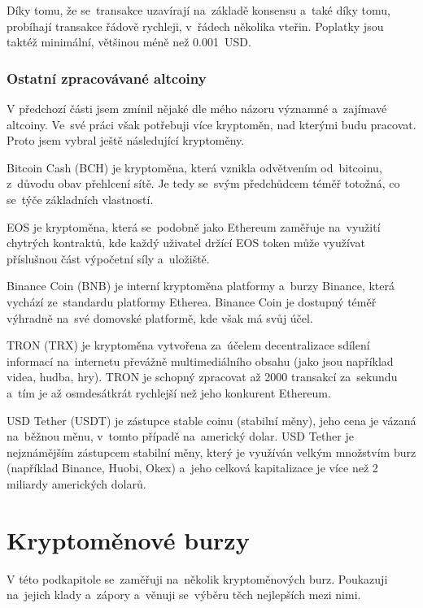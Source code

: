 \documentclass[thesis=B,czech]{FITthesis}[2019/03/21]
\begin{document}
Díky tomu, že se~transakce uzavírají na~základě konsensu a~také díky tomu, probíhají transakce řádově rychleji, v~řádech několika vteřin. Poplatky jsou taktéž minimální, většinou méně než 0.001~USD. \cite{bitinfocharts} \cite{coincodex_ripple}

\subsubsection{Ostatní zpracovávané altcoiny}
V předchozí části jsem zmínil nějaké dle mého názoru významné a~zajímavé altcoiny. Ve~své práci však potřebuji více kryptoměn, nad kterými budu pracovat. Proto jsem vybral ještě následující kryptoměny.

Bitcoin Cash (BCH) je kryptoměna, která vznikla odvětvením od~bitcoinu, z~důvodu obav přehlcení sítě. Je tedy se~svým předchůdcem téměř totožná, co se~týče základních vlastností. \cite{kurzy_bch}

EOS je kryptoměna, která se~podobně jako Ethereum zaměřuje na~využití chytrých kontraktů, kde každý uživatel držící EOS token může využívat \linebreak příslušnou část výpočetní síly a~uložiště. \cite{finex_eos}

Binance Coin (BNB) je interní kryptoměna platformy a~burzy Binance, která vychází ze~standardu platformy Etherea. Binance Coin je dostupný téměř výhradně na~své domovské platformě, kde však má svůj účel. \cite{martin_sistek_bnb}

TRON (TRX) je kryptoměna vytvořena za~účelem decentralizace sdílení informací na~internetu převážně multimediálního obsahu (jako jsou například videa, hudba, hry). TRON je schopný zpracovat až 2000 transakcí za~sekundu a~tím je až osmdesátkrát rychlejší než jeho konkurent Ethereum. \cite{finex_trx}

USD Tether (USDT) je zástupce stable coinu (stabilní měny), jeho cena je vázaná na~běžnou měnu, v~tomto případě na~americký dolar. USD Tether je nejznámějším zástupcem stabilní měny, který je využíván velkým množstvím burz (například Binance, Huobi, Okex) a~jeho celková kapitalizace je více než 2 miliardy amerických dolarů. \cite{mlady_investor_stable_coin} 

\section{Kryptoměnové burzy}
\label{cryptocurrency_exchanges}
V této podkapitole se~zaměřuji na~několik kryptoměnových burz. Poukazuji na~jejich klady a~zápory a~věnuji se~výběru těch nejlepších mezi nimi.
\end{document}
